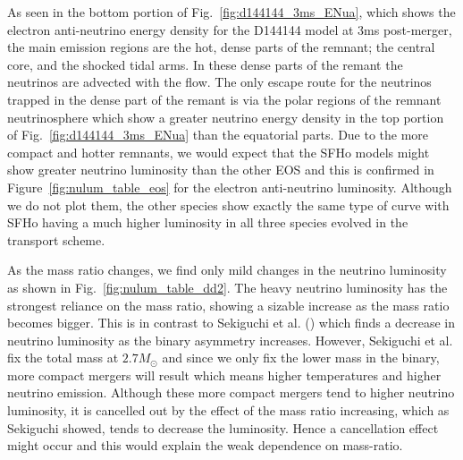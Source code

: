 
As seen in the bottom portion of Fig.~\ref{fig:d144144_3ms_ENua}, which shows the electron anti-neutrino energy density for the D144144 model at 3ms post-merger, the main emission regions are the hot, dense parts of the remnant; the central core, and the shocked tidal arms. In these dense parts of the remant the neutrinos are advected with the flow. The only escape route for the neutrinos trapped in the dense part of the remant is via the polar regions of the remnant neutrinosphere which show a greater neutrino energy density in the top portion of Fig.~\ref{fig:d144144_3ms_ENua} than the equatorial parts. Due to the more compact and hotter remnants,  we would expect that the SFHo models might show greater neutrino luminosity than the other EOS and this is confirmed in Figure~\ref{fig:nulum_table_eos} for the electron anti-neutrino luminosity. Although we do not plot them, the other species show exactly the same type of curve with SFHo having a much higher luminosity in all three species evolved in the transport scheme.

As the mass ratio changes, we find only mild changes in the neutrino luminosity as shown in Fig.~\ref{fig:nulum_table_dd2}. The heavy neutrino luminosity has the strongest reliance on the mass ratio, showing a sizable increase as the mass ratio becomes bigger. This is in contrast to Sekiguchi et al. (\cite{sekiguchi:2016}) which finds a decrease in neutrino luminosity as the binary asymmetry increases. However, Sekiguchi et al. fix the total mass at $2.7M_\odot$ and since we only fix the lower mass in the binary, more compact mergers will result which means higher temperatures and higher neutrino emission. Although these more compact mergers tend to higher neutrino luminosity, it is cancelled out by the effect of the mass ratio increasing, which as Sekiguchi showed, tends to decrease the luminosity. Hence a cancellation effect might occur and this would explain the weak dependence on mass-ratio.
%

